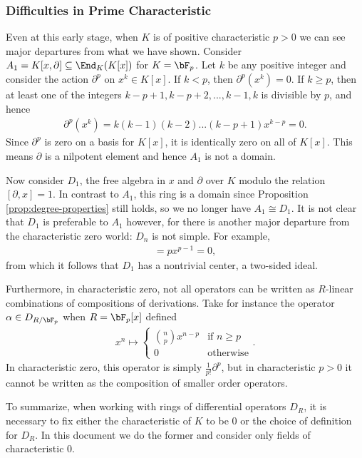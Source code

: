 \subsubsection{Difficulties in Prime Characteristic}
Even at this early stage, when $K$ is of positive characteristic $p > 0$ we can see major departures from what we have shown. Consider $A_1 = K[x,\partial]\subseteq \End_K(K[x])$ for $K = \bF_p$. Let $k$ be any positive integer and consider the action $\partial^p$ on $x^k \in K[x]$. If $k < p$, then $\partial^p(x^k) = 0$. If $k \geq p$, then at least one of the integers $k-p+1,k-p+2,...,k-1,k$ is divisible by $p$, and hence
\begin{align*}
	\partial^p(x^k) = k(k-1)(k-2)...(k-p+1)x^{k-p} = 0.
\end{align*}
Since $\partial^p$ is zero on a basis for $K[x]$, it is identically zero on all of $K[x]$. This means $\partial$ is a nilpotent element and hence $A_1$ is not a domain.

Now consider $D_1$, the free algebra in $x$ and $\partial$ over $K$ modulo the relation $[\partial, x] = 1$. In contrast to $A_1$, this ring is a domain since Proposition \ref{prop:degree-properties} still holds, so we no longer have $A_1 \cong D_1$. It is not clear that $D_1$ is preferable to $A_1$ however, for there is another major departure from the characteristic zero world: $D_n$ is not simple. For example,
\begin{align*}
	[\partial, x^p] = px^{p- 1} = 0,
\end{align*}
from which it follows that $D_1$ has a nontrivial center, a two-sided ideal.

Furthermore, in characteristic zero, not all operators can be written as $R$-linear combinations of compositions of derivations. Take for instance the operator $\alpha \in D_{R/\bF_p}$ when $R = \bF_p[x]$ defined
\begin{align*}
	x^n \mapsto
	\begin{cases}
		\binom{n}{p}x^{n-p} & \text{if } n \geq p \\
		0 & \text{otherwise}
	\end{cases}.
\end{align*}
In characteristic zero, this operator is simply $\frac{1}{p!}\partial^p$, but in characteristic $p > 0$ it cannot be written as the composition of smaller order operators.
\bigskip

To summarize, when working with rings of differential operators $D_{R}$, it is necessary to fix either the characteristic of $K$ to be 0 or the choice of definition for $D_{R}$. In this document we do the former and consider only fields of characteristic 0.


